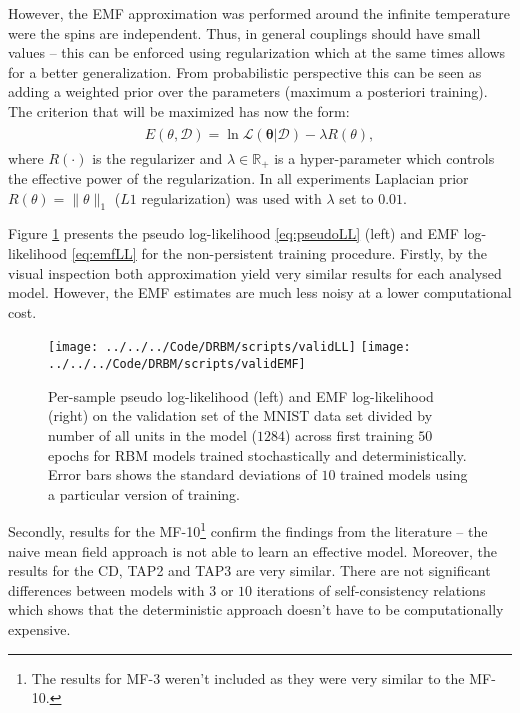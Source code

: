 However, the EMF approximation was performed around the infinite temperature were the spins are independent. Thus, in general couplings should have small values -- this can be enforced using regularization which at the same times allows for a better generalization. From probabilistic perspective this can be seen as adding a weighted prior over the parameters (maximum a posteriori training). The criterion that will be maximized has now the form:
\begin{align}
\begin{split}
E(\theta, \mathcal{D}) = \ln \mathcal{L}(\mathbf{\theta}| \mathcal{D}) - \lambda R(\theta),
\end{split}
\end{align}
where $R(\cdot)$ is the regularizer and $\lambda \in \mathbb{R}_+$ is a hyper-parameter which controls the effective power of the regularization.
In all experiments Laplacian prior $R(\theta) = \| \theta \|_1$ ($L1$ regularization) was used with $\lambda$ set to $0.01$. 

Figure \ref{fig:validLL} presents the pseudo log-likelihood \ref{eq:pseudoLL} (left) and EMF log-likelihood \ref{eq:emfLL} for the non-persistent training procedure. Firstly, by the visual inspection both approximation yield very similar results for each analysed model. However, the EMF estimates are much less noisy at a lower computational cost.
\begin{figure}[!htb]
%
 \texttt{[image: ../../../Code/DRBM/scripts/validLL]}
\endminipage 
{}  
 \texttt{[image: ../../../Code/DRBM/scripts/validEMF]}
\endminipage\hfill
  \caption[Comparison of log-likelihood estimates]{Per-sample pseudo log-likelihood (left) and EMF log-likelihood (right) on the validation set of the MNIST data set divided by number of all units in the model ($1284$) across first training $50$ epochs for RBM models trained stochastically and deterministically. Error bars shows the standard deviations of $10$ trained models using a particular version of training.}
   \label{fig:validLL}
\end{figure}
Secondly, results for the MF-10\footnote{The results for MF-3 weren't included as they were very similar to the MF-10.} confirm the findings from the literature -- the naive mean field approach is not able to learn an effective model. Moreover, the results for the CD, TAP2 and TAP3 are very similar. There are not significant differences between models with $3$ or $10$ iterations of self-consistency relations which shows that the deterministic approach doesn't have to be computationally expensive. 


